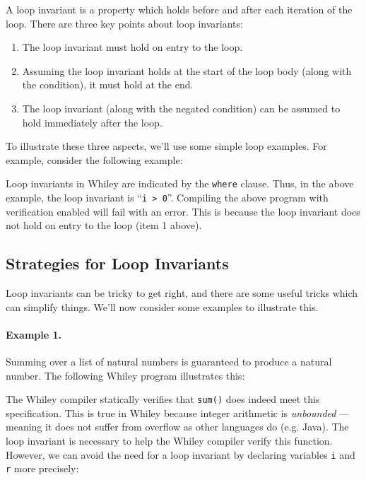 A loop invariant is a property which
holds before and after each iteration of the loop.  There are three
key points about loop invariants:
\begin{enumerate}
\item The loop invariant must hold on entry to the loop.
\item Assuming the loop invariant holds at the start of the loop body
  (along with the condition), it must hold at the end.
\item The loop invariant (along with the negated condition) can be
  assumed to hold immediately after the loop.
\end{enumerate}

To illustrate these three aspects, we'll use some simple loop
examples.  For example, consider the following example:



Loop invariants in Whiley are indicated by the \lstinline{where}
clause.  Thus, in the above example, the loop invariant is
``\lstinline{i > 0}''.  Compiling the above program with verification
enabled will fail with an error.   This is because the loop invariant
does not hold on entry to the loop (item 1 above).

\subsection{Strategies for Loop Invariants}
Loop invariants can be tricky to get right, and there are some useful
tricks which can simplify things.  We'll now consider some examples to
illustrate this.

\paragraph{Example 1.} Summing over a list of natural numbers is
guaranteed to produce a natural number.  The following Whiley program
illustrates this:



The Whiley compiler statically verifies that \lstinline{sum()} does
indeed meet this specification.  This is true in Whiley because
integer arithmetic is {\em unbounded} --- meaning it does not suffer
from overflow as other languages do (e.g. Java).  The loop invariant
is necessary to help the Whiley compiler verify this function.
However, we can avoid the need for a loop invariant by declaring
variables \lstinline{i} and \lstinline{r} more precisely:

